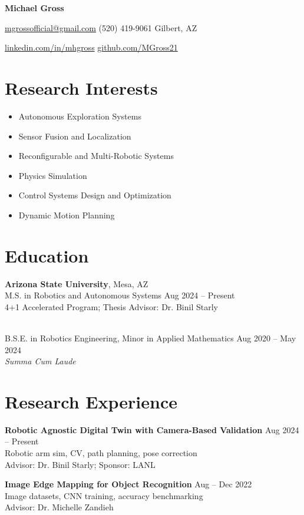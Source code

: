 \documentclass[11pt]{article}
\begin{document}
\centerline{\LARGE\textbf{Michael Gross}}
\centerline{\href{mailto:mgrossofficial@gmail.com}{mgrossofficial@gmail.com} \textbar{} (520) 419-9061 \textbar{} Gilbert, AZ}
\centerline{\href{https://www.linkedin.com/in/mhgross}{linkedin.com/in/mhgross} \textbar{} \href{https://github.com/MGross21}{github.com/MGross21}}

\section*{Research Interests}
\begin{itemize}
  \item Autonomous Exploration Systems
  \item Sensor Fusion and Localization
  \item Reconfigurable and Multi-Robotic Systems
  \item Physics Simulation
  \item Control Systems Design and Optimization
  \item Dynamic Motion Planning
\end{itemize}

\section*{Education}
\textbf{Arizona State University}, Mesa, AZ\\
M.S. in Robotics and Autonomous Systems \hfill Aug 2024 -- Present\\
4+1 Accelerated Program; Thesis Advisor: Dr. Binil Starly

\\[0.5em]
B.S.E. in Robotics Engineering, Minor in Applied Mathematics \hfill Aug 2020 -- May 2024\\
\textit{Summa Cum Laude}

\section*{Research Experience}
\textbf{Robotic Agnostic Digital Twin with Camera-Based Validation} \hfill Aug 2024 -- Present\\
Robotic arm sim, CV, path planning, pose correction\\Advisor: Dr. Binil Starly; Sponsor: LANL

\textbf{Image Edge Mapping for Object Recognition} \hfill Aug -- Dec 2022\\
Image datasets, CNN training, accuracy benchmarking\\Advisor: Dr. Michelle Zandieh
\end{document}
